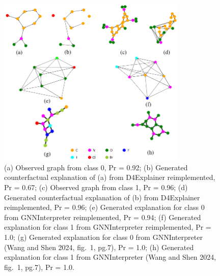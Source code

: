 \documentclass[
  11pt,
  letterpaper,
]{article}
\begin{document}
\begin{figure}

{\centering \includegraphics[width=0.8\textwidth,height=0.8\textheight]{figures/mutag_plot_together.png}

}

\caption{(a) Observed graph from class 0, Pr = 0.92; (b) Generated
counterfactual explanation of (a) from D4Explainer reimplemented, Pr =
0.67; (c) Observed graph from class 1, Pr = 0.96; (d) Generated
counterfactual explanation of (b) from D4Explainer reimplemented, Pr =
0.96; (e) Generated explanation for class 0 from GNNInterpreter
reimplemented, Pr = 0.94; (f) Generated explanation for class 1 from
GNNInterpreter reimplemented, Pr = 1.0; (g) Generated explanation for
class 0 from GNNInterpreter (Wang and Shen 2024, fig.~1, pg.7), Pr =
1.0; (h) Generated explanation for class 1 from GNNInterpreter (Wang and
Shen 2024, fig.~1, pg.7), Pr = 1.0.}

\end{figure}
\end{document}
